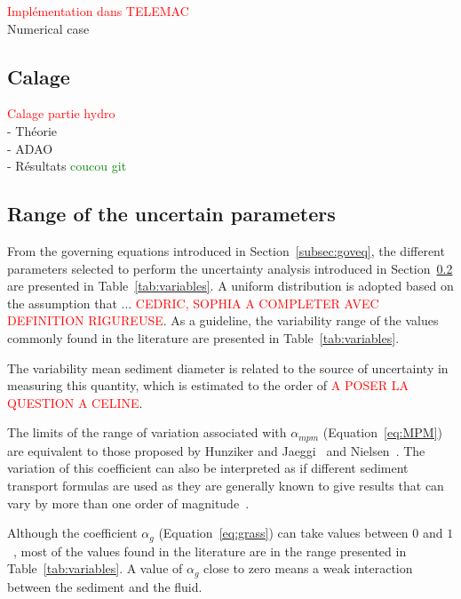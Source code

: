 \textcolor{red}{Implémentation dans TELEMAC} \\
Numerical case \\

\subsection{Calage}
\textcolor{red}{Calage partie hydro} \\
- Théorie \\
- ADAO \\
- Résultats
\textcolor{green}{coucou git} \\

\subsection{Range of the uncertain parameters}
From the governing equations introduced in Section~\ref{subsec:goveq}, the different parameters selected to perform the uncertainty analysis introduced in Section~\ref{} are presented in Table~\ref{tab:variables}. A uniform distribution is adopted based on the assumption that ... \textcolor{red}{CEDRIC, SOPHIA A COMPLETER AVEC DEFINITION RIGUREUSE}. As a guideline, the variability range of the values commonly found in the literature are presented in Table~\ref{tab:variables}.

The variability mean sediment diameter is related to the source of uncertainty in measuring this quantity, which is estimated to the order of \textcolor{red}{A POSER LA QUESTION A CELINE}.

The limits of the range of variation associated with $\alpha_{mpm}$ (Equation~\ref{eq:MPM}) are equivalent to those proposed by Hunziker and Jaeggi~\cite{doi:10.1061/(ASCE)0733-9429(2002)128:12(1060)} and Nielsen~\cite{nielsen1992coastal}. The variation of this coefficient can also be interpreted as if different sediment transport formulas are used as they are generally known to give results that can vary by more than one order of magnitude~\cite{WRCR:WRCR12272}.

Although the coefficient $\alpha_g$ (Equation~\ref{eq:grass}) can take values between $0$ and $1$~\cite{diaz2008sediment}, most of the values found in the literature are in the range presented in Table~\ref{tab:variables}. A value of $\alpha_g$ close to zero means a weak interaction between the sediment and the fluid.

